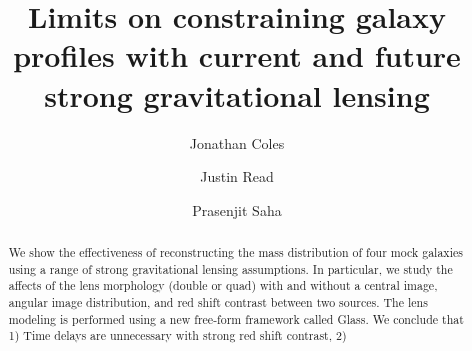 \documentclass[onecolumn,galley]{mn2e}
\title{Limits on constraining galaxy profiles with current and future strong gravitational lensing}
\author{%
Jonathan Coles 
\and 
Justin Read
\and 
Prasenjit Saha 
}
\newcommand{\Glass}{{\sc Glass}}
\begin{document}
\maketitle

\tableofcontents

\begin{abstract}
We show the effectiveness of reconstructing the mass distribution of four mock galaxies using
a range of strong gravitational lensing assumptions. In particular, we study
the affects of the lens morphology (double or quad) with and without a central
image, angular image distribution, and red shift contrast between two sources.
The lens modeling is performed using a new free-form framework called \Glass.
We conclude that 
1) Time delays are unnecessary with strong red shift contrast,
2)





\end{abstract}
\end{document}
